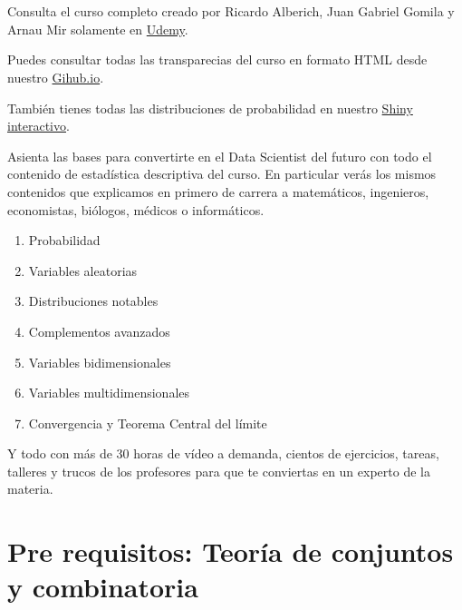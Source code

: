 \documentclass[]{book}
\providecommand{\tightlist}{%
  \setlength{\itemsep}{0pt}\setlength{\parskip}{0pt}}
\begin{document}

{
\setcounter{tocdepth}{1}
\tableofcontents
}
\newcommand{\FunCar}{\phi}
\newcommand{\FunGenMom}{m}
\newcommand{\Momk}{M}
\newcommand{\MomCenk}{MC}
\newcommand\momento{m}
\newcommand{\momentocentral}{\mu}
\newcommand{\Entropia}{H}

\hypertarget{section}{%
\chapter*{}\label{section}}

Consulta el curso completo creado por Ricardo Alberich, Juan Gabriel Gomila y Arnau Mir solamente en \href{https://www.udemy.com/course/probabilidad-y-variables-aleatorias-para-ml-con-r-y-python/?couponCode=B85F8D52148DF5AAD8F7}{Udemy}.

Puedes consultar todas las transparecias del curso en formato HTML desde nuestro \href{https://joanby.github.io/bookdown-probabilidad/}{Gihub.io}.

También tienes todas las distribuciones de probabilidad en nuestro \href{https://joanby.shinyapps.io/DistribucionesNotables/}{Shiny interactivo}.

Asienta las bases para convertirte en el Data Scientist del futuro con todo el contenido de estadística descriptiva del curso. En particular verás los mismos contenidos que explicamos en primero de carrera a matemáticos, ingenieros, economistas, biólogos, médicos o informáticos.

\begin{enumerate}
\def\labelenumi{\arabic{enumi}.}
\tightlist
\item
  Probabilidad
\item
  Variables aleatorias
\item
  Distribuciones notables
\item
  Complementos avanzados
\item
  Variables bidimensionales
\item
  Variables multidimensionales
\item
  Convergencia y Teorema Central del límite
\end{enumerate}

Y todo con más de 30 horas de vídeo a demanda, cientos de ejercicios, tareas, talleres y trucos de los profesores para que te conviertas en un experto de la materia.

\hypertarget{pre-requisitos-teoruxeda-de-conjuntos-y-combinatoria}{%
\chapter*{Pre requisitos: Teoría de conjuntos y combinatoria}\label{pre-requisitos-teoruxeda-de-conjuntos-y-combinatoria}}
\end{document}
